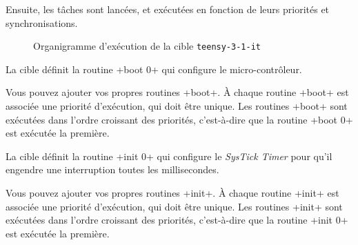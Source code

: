 Ensuite, les tâches sont lancées, et exécutées en fonction de leurs priorités et synchronisations.


\begin{figure}[t]
  \centering
  \small
  \caption{Organigramme d'exécution de la cible \texttt{teensy-3-1-it}}
  \ligne
\end{figure}











La cible définit la routine \omnibus+boot 0+ qui configure le micro-contrôleur.

Vous pouvez ajouter vos propres routines \omnibus+boot+. À chaque routine \omnibus+boot+ est associée une priorité d'exécution, qui doit être unique. Les routines \omnibus+boot+ sont exécutées dans l'ordre croissant des priorités, c'est-à-dire que la routine \omnibus+boot 0+ est exécutée la première.






La cible définit la routine \omnibus+init 0+ qui configure le \emph{SysTick Timer} pour qu'il engendre une interruption toutes les millisecondes.

Vous pouvez ajouter vos propres routines \omnibus+init+. À chaque routine \omnibus+init+ est associée une priorité d'exécution, qui doit être unique. Les routines \omnibus+init+ sont exécutées dans l'ordre croissant des priorités, c'est-à-dire que la routine \omnibus+init 0+ est exécutée la première.












